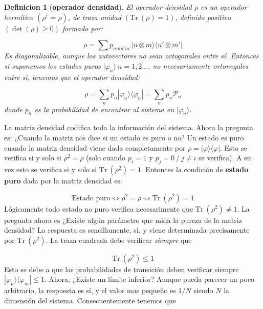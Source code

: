 \documentclass[12pt,a4paper]{book}
\numberwithin{equation}{chapter}
\numberwithin{figure}{chapter}
\newcommand{\Tr}{\mathrm{Tr} \ }
\newtheorem{definition}{Definicion}[section]
\begin{document}
\begin{definition}[\textbf{operador densidad}]
El operador densidad $\rho$ es un operador hermítico $( \rho^\dagger = \rho)$, de traza unidad $(\Tr (\rho) = 1)$, definido positivo $(\det (\rho) \geq 0)$ formado por:

\begin{equation}
\rho = \sum p_{nmn'm'} |n \otimes m \rangle \langle n' \otimes m' |
\end{equation}
Es diagonalizable, aunque los autovectores no sean ortogonales entre sí. Entonces si suponemos los estados puros $|\varphi_n \rangle \ n=1,2...$, no necesariamente ortonogales entre sí, tenemos que el operador densidad:

\begin{equation}
\rho = \sum_ n p_n |\varphi_n \rangle \langle \varphi_n | = \sum_n p_n \mathcal{P}_n
\end{equation}
donde $p_n$ es la probabilidad de encontrar al sistema en $|\varphi_n \rangle$. 
\end{definition}

La matriz densidad codifica toda la información del sistema. Ahora la pregunta es: ¿Cuando la matriz nos dice si un estado es puro o no? Un estado es puro cuando la matriz densidad viene dada completamente por $\rho = |\varphi \rangle \langle \varphi |$. Esto se verifica si y solo si $\rho^2 = \rho$ (solo cuando $p_i=1$ y $p_j = 0 \ / \ j\neq i$ se verifica). A su vez esto se verifica si y solo si $\Tr (\rho^2) = 1$. Entonces la condición de \textbf{estado puro} dada por la matriz densidad es:

\begin{equation}
\text{Estado puro} \Longleftrightarrow \rho^2 = \rho \Longleftrightarrow \Tr  (\rho^2) = 1
\end{equation} 
Lógicamente todo estado no puro verifica necesarimente que $\Tr (\rho^2)  \neq 1$. La pregunta ahora es ¿Existe algún parámetro que mida la pureza de la matriz densidad? La respuesta es sencillamente, si, y viene determinada precisamente por $\Tr (\rho^2)$. La traza cuadrada debe verificar \textit{siempre} que

\begin{equation}
\Tr (\rho^2) \leq 1
\end{equation}
Esto se debe a que las probabilidades de transición deben verificar siempre $|\varphi_n \rangle \langle \varphi_m | \leq 1$. Ahora, ¿Existe un límite inferior? Aunque pueda parecer un poco arbitrario, la respuesta es sí, y el valor mas pequeño es $1/N$ siendo $N$ la dimensión del sistema. Consecuentemente tenemos que
\end{document}
